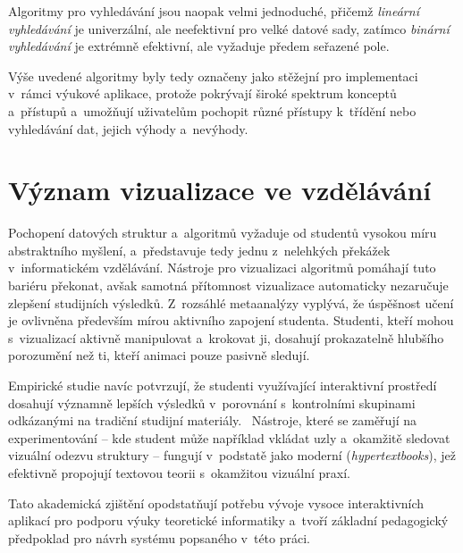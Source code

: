 Algoritmy pro vyhledávání jsou naopak velmi jednoduché, přičemž \textit{lineární vyhledávání} je univerzální, ale neefektivní pro velké datové sady, zatímco \textit{binární vyhledávání} je extrémně efektivní, ale vyžaduje předem seřazené pole.

Výše uvedené algoritmy byly tedy označeny jako stěžejní pro implementaci v~rámci výukové aplikace, protože pokrývají široké spektrum konceptů a~přístupů a~umožňují uživatelům pochopit různé přístupy k~třídění nebo vyhledávání dat, jejich výhody a~nevýhody.

\section{Význam vizualizace ve vzdělávání}
\label{sec:pedagogical-impact}

Pochopení datových struktur a~algoritmů vyžaduje od studentů vysokou míru abstraktního myšlení, a~představuje tedy jednu z~nelehkých překážek v~informatickém vzdělávání.
Nástroje pro vizualizaci algoritmů pomáhají tuto bariéru překonat, avšak samotná přítomnost vizualizace automaticky nezaručuje zlepšení studijních výsledků.
Z~rozsáhlé metaanalýzy vyplývá, že úspěšnost učení je ovlivněna především mírou aktivního zapojení studenta.
Studenti, kteří mohou s~vizualizací aktivně manipulovat a~krokovat ji, dosahují prokazatelně hlubšího porozumění než ti, kteří animaci pouze pasivně sledují.~\cite{urquiza2009}

Empirické studie navíc potvrzují, že studenti využívající interaktivní prostředí dosahují významně lepších výsledků v~porovnání s~kontrolními skupinami odkázanými na tradiční studijní materiály.~\cite{kogan2024}
Nástroje, které se zaměřují na experimentování -- kde student může například vkládat uzly a~okamžitě sledovat vizuální odezvu struktury -- fungují v~podstatě jako moderní  (\textit{hypertextbooks}), jež efektivně propojují textovou teorii s~okamžitou vizuální praxí.~\cite{fouh2012}

Tato akademická zjištění opodstatňují potřebu vývoje vysoce interaktivních aplikací pro podporu výuky teoretické informatiky a~tvoří základní pedagogický předpoklad pro návrh systému popsaného v~této práci.
